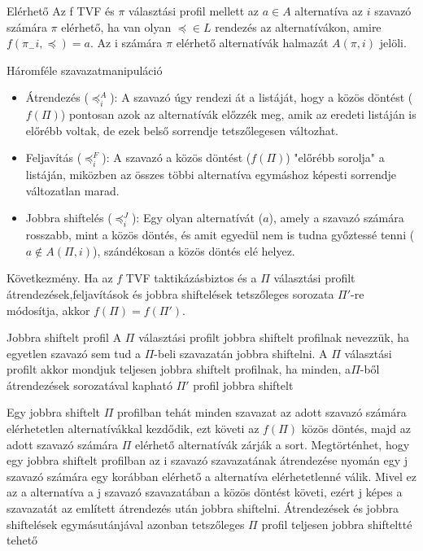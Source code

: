 	\begin{definition}{Elérhető}{}
		Az f TVF és $\pi$ választási profil mellett az $a \in A$ alternatíva az $i$ szavazó számára $\pi$ elérhető, ha van olyan $\preceq \in L$ rendezés az alternatívákon, amire $f(\pi_-i, \preceq)=a$. Az i számára $\pi$ elérhető alternatívák halmazát $A(\pi,i)$ jelöli.
	\end{definition}
	
		\begin{definition}{Háromféle szavazatmanipuláció}{}
		\begin{itemize}
			\item Átrendezés ($\preceq_i^A$): A szavazó úgy rendezi át a listáját, hogy a közös döntést ($f(\Pi)$) pontosan azok az alternatívák előzzék meg, amik az eredeti listáján is előrébb voltak, de ezek belső sorrendje tetszőlegesen változhat.
			\item Feljavítás ($\preceq_i^F$): A szavazó a közös döntést ($f(\Pi)$) "előrébb sorolja" a listáján, miközben az összes többi alternatíva egymáshoz képesti sorrendje változatlan marad.
			\item Jobbra shiftelés ($\preceq_i^J$): Egy olyan alternatívát ($a$), amely a szavazó számára rosszabb, mint a közös döntés, és amit egyedül nem is tudna győztessé tenni ($a \notin A(\Pi, i)$), szándékosan a közös döntés elé helyez.
		\end{itemize}
	\end{definition}
	
	Következmény. Ha az $f$ TVF taktikázásbiztos és a $\Pi$ választási profilt átrendezések,feljavítások és jobbra shiftelések tetszőleges sorozata $\Pi'$-re módosítja, akkor $f(\Pi) = f(\Pi')$.
	
	\begin{definition}{Jobbra shiftelt profil}{}
		A $\Pi$ választási profilt jobbra shiftelt profilnak nevezzük, ha egyetlen szavazó sem tud a $\Pi$-beli szavazatán jobbra shiftelni.	A $\Pi$ választási profilt akkor mondjuk teljesen jobbra shiftelt profilnak, ha minden, a$\Pi$-ből átrendezések sorozatával kapható $\Pi'$ profil jobbra shiftelt
	\end{definition}
	Egy jobbra shiftelt $\Pi$ profilban tehát minden szavazat az adott szavazó számára elérhetetlen
	alternatívákkal kezdődik, ezt követi az $f(\Pi)$ közös döntés, majd az adott szavazó számára $\Pi$ elérhető alternatívák zárják a sort. Megtörténhet, hogy egy jobbra shiftelt profilban az i szavazó
	szavazatának átrendezése nyomán egy j szavazó számára egy korábban elérhető a alternatíva
	elérhetetlenné válik. Mivel ez az a alternatíva a j szavazó szavazatában a közös döntést követi,
	ezért j képes a szavazatát az említett átrendezés után jobbra shiftelni. Átrendezések és jobbra
	shiftelések egymásutánjával azonban tetszőleges $\Pi$ profil teljesen jobbra shifteltté tehető
	
